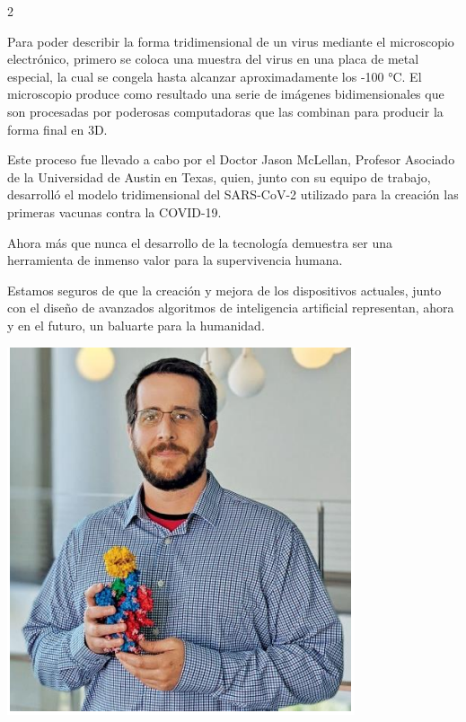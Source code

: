 \documentclass[12pt,spanish,Letterpaper,openany]{book}
\begin{document}
\begin {multicols}{2}
\begin {flushleft}
\begin{minipage}[c]{\columnwidth}
\end{minipage}

\end {flushleft}

Para poder describir la forma tridimensional de un virus mediante el microscopio electrónico, primero se coloca
una muestra del virus en una placa de metal especial, la cual se congela hasta alcanzar aproximadamente los -100 °C.
El microscopio produce como resultado una serie de imágenes bidimensionales que son procesadas por
poderosas computadoras que las combinan para producir la forma final en 3D.

Este proceso fue llevado a cabo por el Doctor Jason McLellan, Profesor Asociado de la Universidad de Austin en Texas, quien,
junto con su equipo de trabajo, desarrolló el modelo tridimensional del SARS-CoV-2 utilizado para la creación las
primeras vacunas contra la COVID-19.

Ahora más que nunca el desarrollo de la tecnología demuestra ser una herramienta de inmenso valor para la supervivencia humana.

Estamos seguros de que la creación y mejora de los dispositivos actuales, junto con el diseño
de avanzados algoritmos de inteligencia artificial representan, ahora y en el futuro, un baluarte
para la humanidad.

\begin {flushleft}
\noindent\begin{minipage}[c]{\columnwidth}
\centering

\includegraphics[width=0.65\linewidth]{images/pareja51_03}


\end{minipage}
\end{flushleft}
\end{multicols}
\end{document}
